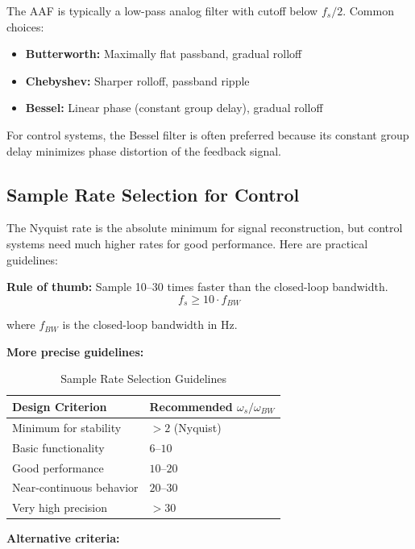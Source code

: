 The AAF is typically a low-pass analog filter with cutoff below $f_s/2$. Common choices:

\begin{itemize}
    \item \textbf{Butterworth:} Maximally flat passband, gradual rolloff
    \item \textbf{Chebyshev:} Sharper rolloff, passband ripple
    \item \textbf{Bessel:} Linear phase (constant group delay), gradual rolloff
\end{itemize}

For control systems, the Bessel filter is often preferred because its constant group delay minimizes phase distortion of the feedback signal.

\subsection{Sample Rate Selection for Control}

The Nyquist rate is the absolute minimum for signal reconstruction, but control systems need much higher rates for good performance. Here are practical guidelines:

\textbf{Rule of thumb:} Sample 10--30 times faster than the closed-loop bandwidth.
\begin{equation}
f_s \geq 10 \cdot f_{BW}
\end{equation}

where $f_{BW}$ is the closed-loop bandwidth in Hz.

\textbf{More precise guidelines:}

\begin{table}[htbp]
\centering
\caption{Sample Rate Selection Guidelines}
\label{tab:sample_rate_guidelines}
\begin{tabular}{ll}
\toprule
\textbf{Design Criterion} & \textbf{Recommended $\omega_s/\omega_{BW}$} \\
\midrule
Minimum for stability & $> 2$ (Nyquist) \\
Basic functionality & $6$--$10$ \\
Good performance & $10$--$20$ \\
Near-continuous behavior & $20$--$30$ \\
Very high precision & $> 30$ \\
\bottomrule
\end{tabular}
\end{table}

\textbf{Alternative criteria:}


